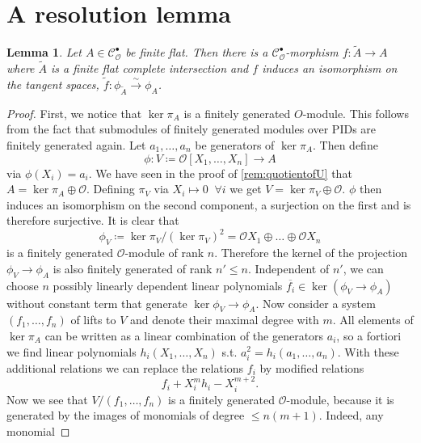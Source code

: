 \documentclass{article}
\theoremstyle{plain}%
\newtheorem{lemma}{Lemma}[section]
\theoremstyle{definition}
\theoremstyle{remark}
\newcommand{\cob}{\mathcal{C}_\mathcal{O}^\bullet}
\begin{document}
\section{A resolution lemma}

\begin{lemma}\label{lem:resolution}\cite[theorem 5.26]{darmon1995fermat}
    Let \(A \in \cob\) be finite flat. Then there is a \(\cob\)-morphism \(f\colon \tilde A \to A\) 
    where \(\tilde A\) is a finite flat complete intersection and \(f\) induces an isomorphism on the tangent spaces,
    \(\tilde f \colon \phi_{\tilde{A}} \xrightarrow{\sim} \phi_A\).
\end{lemma}
\begin{proof}
    First, we notice that \(\ker \pi_A\) is a finitely generated \(O\)-module.
    This follows from the fact that submodules of finitely generated modules over PIDs
    are finitely generated again.
    Let \(a_1, \dots, a_n\) be generators of \(\ker \pi_A\). Then define
    \[
        \phi\colon V \coloneqq \mathcal{O}[X_1, \dots, X_n] \to A  
    \]
    via \(\phi(X_i) = a_i\).
    We have seen in the proof of \cref{rem:quotientofU} that \(A = \ker \pi_A \oplus \mathcal{O}\).
    Defining \(\pi_V\) via \(X_i \mapsto 0\;\; \forall i\) we get \(V = \ker \pi_V \oplus \mathcal{O}\).
    \(\phi\) then induces an isomorphism on the second component, a surjection on the first
    and is therefore surjective.
    It is clear that
    \[
        \phi_V \coloneqq \ker \pi_V/(\ker \pi_V)^2 = \mathcal{O}X_1 \oplus \dots \oplus \mathcal{O}X_n
    \] 
    is a finitely generated \(\mathcal{O}\)-module of rank \(n\).
    Therefore the kernel of the projection \(\phi_V \to \phi_A\) is also finitely generated 
    of rank \(n' \leq n\).
    Independent of \(n'\), we can choose \(n\) possibly linearly dependent linear polynomials 
    \(\overline{f_i} \in \ker(\phi_V \to \phi_A)\) without constant term that generate 
    \(\ker \phi_V \to \phi_A\).
    Now consider a system \((f_1, \dots, f_n)\) of lifts to \(V\) and denote their maximal degree with \(m\).
    All elements of \(\ker \pi_A\) can be written as a linear combination of the generators \(a_i\), so a fortiori
    we find linear polynomials \(h_i(X_1, \dots, X_n)\) s.t. \(a_i^2 = h_i(a_1, \dots, a_n)\).
    With these additional relations we can replace the relations \(f_i\) by modified relations
    \[
        f_i + X_i^mh_i - X_i^{m+2}.  
    \]
    Now we see that \(V/(f_1, \dots, f_n)\) is a finitely generated \(\mathcal{O}\)-module, 
    because it is generated by the images of monomials of degree \(\leq n(m+1)\). Indeed, any monomial

\end{proof}
\end{document}
